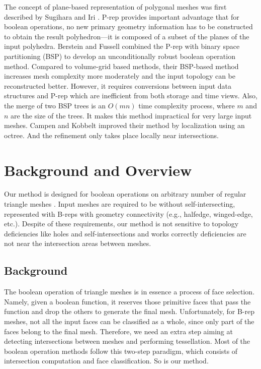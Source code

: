 \documentclass[10pt,journal,compsoc]{IEEEtran}
\begin{document}
The concept of plane-based representation of polygonal meshes was first described by Sugihara and Iri \cite{sugihara1990solid}. P-rep provides important advantage that for boolean operations, no new primary geometry information has to be constructed to obtain the result polyhedron---it is composed of a subset of the planes of the input polyhedra. Berstein and Fussell \cite{bernstein2009fast} combined the P-rep with binary space partitioning (BSP) \cite{thibault1987set,naylor1990merging} to develop an unconditionally robust boolean operation method. Compared to volume-grid based methods, their BSP-based method increases mesh complexity more moderately and the input topology can be reconstructed better. However, it requires conversions between input data structures and P-rep which are inefficient from both storage and time views. Also, the merge of two BSP trees is an $O(mn)$ time complexity process, where $m$ and $n$ are the size of the trees. It makes this method impractical for very large input meshes. Campen and Kobbelt \cite{campen2010exact} improved their method by localization using an octree. And the refinement only takes place locally near intersections.


\section{Background and Overview}

\label{sec:overview}
Our method is designed for boolean operations on arbitrary number of regular triangle meshes \cite{requicha1985boolean}. Input meshes are required to be without self-intersecting, represented with B-reps with geometry connectivity (e.g., halfedge, winged-edge, etc.). Despite of these requirements, our method is not sensitive to topology deficiencies like holes and self-intersections and works correctly deficiencies are not near the intersection areas between meshes.


\subsection{Background}
\label{sec:paradigm}

The boolean operation of triangle meshes is in essence a process of face selection. Namely, given a boolean function, it reserves those primitive faces that pass the function and drop the others to generate the final mesh. Unfortunately, for B-rep meshes, not all the input faces can be classified as a whole, since only part of the faces belong to the final mesh. Therefore, we need an extra step aiming at detecting intersections between meshes and performing tessellation. Most of the boolean operation methods follow this two-step paradigm, which consists of intersection computation and face classification. So is our method.
\end{document}
